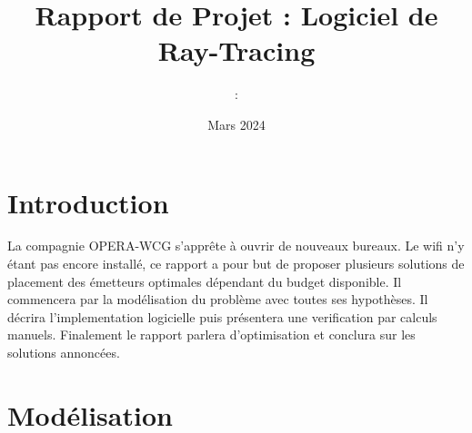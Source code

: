 \documentclass[sn-mathphys-num]{sn-jnl}
\title[Article Title]{Rapport de Projet : Logiciel de Ray-Tracing}
\author{\fnm{Damian} \sur{Hubert} : \sfx{Physique BA3}}
\date{Mars 2024}
\begin{document}

\setlength{\abovedisplayskip}{1pt}
\setlength{\belowdisplayskip}{1pt}

\maketitle
\tableofcontents
\section{Introduction}
La compagnie OPERA-WCG s'apprête à ouvrir de nouveaux bureaux. Le wifi n'y étant pas encore
installé, ce rapport a pour but de proposer plusieurs solutions de placement des émetteurs optimales dépendant
du budget disponible. Il commencera par la modélisation du problème avec toutes
ses hypothèses. Il décrira l'implementation logicielle
puis présentera une verification par calculs manuels. 
Finalement le rapport parlera d'optimisation et conclura sur les solutions annoncées.



\section{Modélisation}
\end{document}

